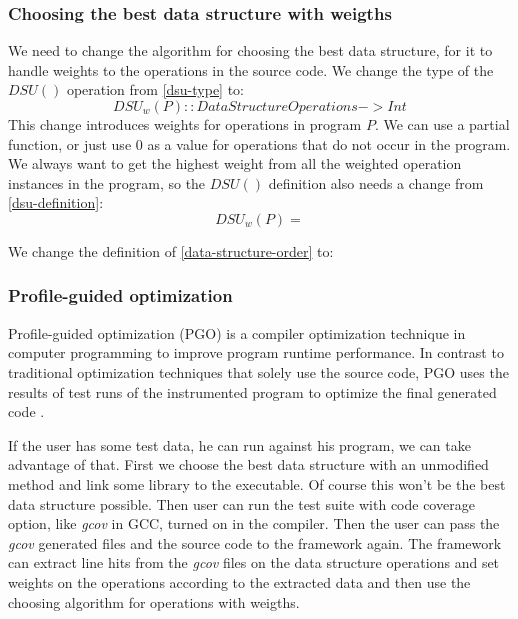 \documentclass[11pt]{article}
\begin{document}
		\subsubsection{Choosing the best data structure with weigths}
			We need to change the algorithm for choosing the best data structure, for it to handle weights to the operations in the source code. We
			change the type of the $DSU()$ operation from
			\ref{dsu-type} to:
			\begin{equation}
				DSU_w(P) :: DataStructureOperations -> Int
			\end{equation}
			This change introduces weights for operations in program $P$. We can use a partial function, or just use $0$ as a value for operations
			that do not occur in the program. We always want to get the highest weight from all the weighted operation instances in the program, so
			the $DSU()$ definition also needs a change from \ref{dsu-definition}:
			\begin{equation}
				DSU_w(P) =
			\end{equation}

			We change the definition of \autoref{data-structure-order} to:
			\begin{equation}
			\end{equation}

		\subsubsection{Profile-guided optimization}
			Profile-guided optimization (PGO) is a compiler optimization technique in computer programming to improve program runtime performance.
			In contrast to traditional optimization techniques that solely use the source code, PGO uses the results of test runs of the
			instrumented program to optimize the final generated code .

			If the user has some test data, he can run against his program, we can take advantage of that. First we choose the best data structure
			with an unmodified method and link some library to the executable. Of course this won't be the best data structure possible. Then user
			can run the test suite with code coverage option, like \emph{gcov} in GCC, turned on in the compiler.
			Then the user can pass the \emph{gcov} generated files and the source code to the framework again. The framework can extract line hits
			from the \emph{gcov} files on the data structure operations and set weights on the operations according to the extracted data and then
			use the choosing algorithm for operations with weigths.
\end{document}
